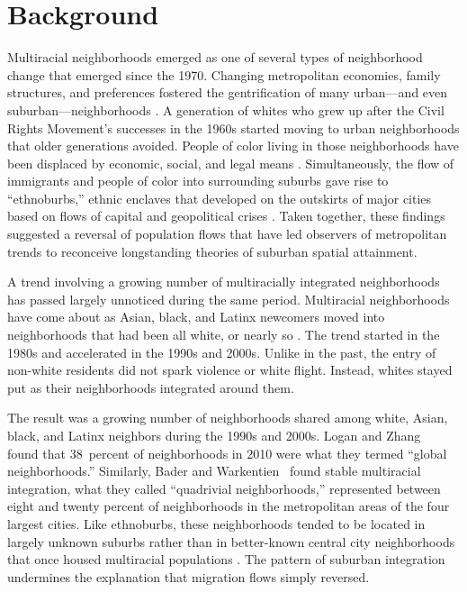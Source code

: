 \documentclass{baderart}
\begin{document}
\section{Background}\label{background}
Multiracial neighborhoods emerged as one of several types of neighborhood change that emerged since the 1970. Changing metropolitan economies, family structures, and preferences fostered the gentrification of many urban---and even suburban---neighborhoods \citep{rose_rethinking_1984, slater_gentrification_2004, lung-amam_trespassers?:_2017}. A generation of whites who grew up after the Civil Rights Movement's successes in the 1960s started moving to urban neighborhoods that older generations avoided. People of color living in those neighborhoods have been displaced by economic, social, and legal means \citep{freeman_there_2006, hyra_back---city_2014, hyra_race_2017}. Simultaneously, the flow of immigrants and people of color into surrounding suburbs gave rise to ``ethnoburbs,'' ethnic enclaves that developed on the outskirts of major cities based on flows of capital and geopolitical crises \citep{li_anatomy_1998,  lung-amam_trespassers?:_2017, kye_rise_2018}. Taken together, these findings suggested a reversal of population flows that have led observers of metropolitan trends to reconceive longstanding theories of suburban spatial attainment. 

A trend involving a growing number of multiracially integrated neighborhoods has passed largely unnoticed during the same period. Multiracial neighborhoods have come about as Asian, black, and Latinx newcomers moved into neighborhoods that had been all white, or nearly so \citep{logan_global_2010, bader_fragmented_2016} . The trend started in the 1980s and accelerated in the 1990s and 2000s. Unlike in the past, the entry of non-white residents did not spark violence or white flight. Instead, whites stayed put as their neighborhoods integrated around them. 

The result was a growing number of neighborhoods shared among white, Asian, black, and Latinx neighbors during the 1990s and 2000s. Logan and Zhang~\citeyearpar{logan_global_2011} found that 38~percent of neighborhoods in 2010 were what they termed ``global neighborhoods.'' Similarly, Bader and Warkentien~\citeyearpar{bader_fragmented_2016} found stable multiracial integration, what they called ``quadrivial neighborhoods,'' represented between eight and twenty percent of neighborhoods in the metropolitan areas of the four largest cities. Like ethnoburbs, these neighborhoods tended to be located in largely unknown suburbs rather than in better-known central city neighborhoods that once housed multiracial populations \citep{bader_fragmented_2016, parisi_remaking_2019}. The pattern of suburban integration undermines the explanation that migration flows simply reversed. 
\end{document}
